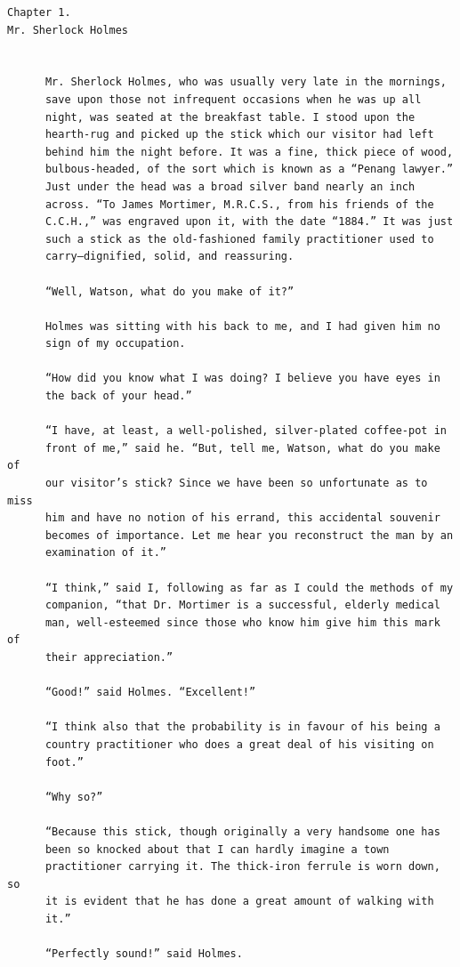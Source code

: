 \documentclass{article}
\begin{document}
\begin{verbatim}
Chapter 1.
Mr. Sherlock Holmes


      Mr. Sherlock Holmes, who was usually very late in the mornings,
      save upon those not infrequent occasions when he was up all
      night, was seated at the breakfast table. I stood upon the
      hearth-rug and picked up the stick which our visitor had left
      behind him the night before. It was a fine, thick piece of wood,
      bulbous-headed, of the sort which is known as a “Penang lawyer.”
      Just under the head was a broad silver band nearly an inch
      across. “To James Mortimer, M.R.C.S., from his friends of the
      C.C.H.,” was engraved upon it, with the date “1884.” It was just
      such a stick as the old-fashioned family practitioner used to
      carry—dignified, solid, and reassuring.

      “Well, Watson, what do you make of it?”

      Holmes was sitting with his back to me, and I had given him no
      sign of my occupation.

      “How did you know what I was doing? I believe you have eyes in
      the back of your head.”

      “I have, at least, a well-polished, silver-plated coffee-pot in
      front of me,” said he. “But, tell me, Watson, what do you make of
      our visitor’s stick? Since we have been so unfortunate as to miss
      him and have no notion of his errand, this accidental souvenir
      becomes of importance. Let me hear you reconstruct the man by an
      examination of it.”

      “I think,” said I, following as far as I could the methods of my
      companion, “that Dr. Mortimer is a successful, elderly medical
      man, well-esteemed since those who know him give him this mark of
      their appreciation.”

      “Good!” said Holmes. “Excellent!”

      “I think also that the probability is in favour of his being a
      country practitioner who does a great deal of his visiting on
      foot.”

      “Why so?”

      “Because this stick, though originally a very handsome one has
      been so knocked about that I can hardly imagine a town
      practitioner carrying it. The thick-iron ferrule is worn down, so
      it is evident that he has done a great amount of walking with
      it.”

      “Perfectly sound!” said Holmes.


\end{verbatim}
\end{document}
